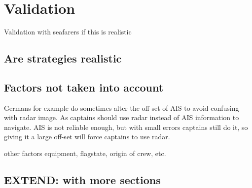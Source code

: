 \chapter{Validation}
Validation with seafarers if this is realistic

\section{Are strategies realistic}

\section{Factors not taken into account}
Germans for example do sometimes alter the off-set of AIS to avoid confusing with radar image. As captains should use radar instead of AIS information to navigate. AIS is not reliable enough, but with small errors captains still do it, so giving it a large off-set will force captains to use radar.

other factors equipment, flagstate, origin of crew, etc.

\section{EXTEND: with more sections}
